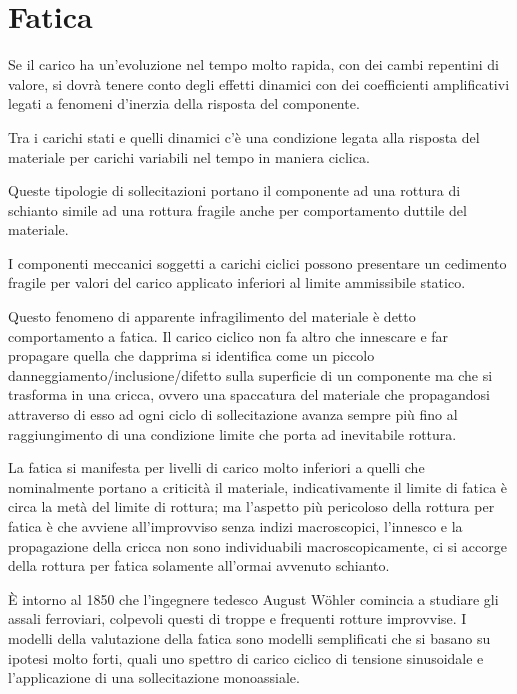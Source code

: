 
	
\section{Fatica}
Se il carico ha un'evoluzione nel tempo molto rapida, con dei cambi repentini di valore, si dovrà tenere conto degli effetti dinamici con dei coefficienti amplificativi legati a fenomeni d'inerzia della risposta del componente. \newline
		
		Tra i carichi stati e quelli dinamici c'è una condizione legata alla risposta del materiale per carichi variabili nel tempo in maniera ciclica.
		
		Queste tipologie di sollecitazioni portano il componente ad una rottura di schianto simile ad una rottura fragile anche per comportamento duttile del materiale. \newline
		
		I componenti meccanici soggetti a carichi ciclici possono presentare un cedimento fragile per valori del carico applicato inferiori al limite ammissibile statico.
		
		Questo fenomeno di apparente infragilimento del materiale è detto comportamento a fatica. Il carico ciclico non fa altro che innescare e far propagare quella che dapprima si identifica come un piccolo danneggiamento/inclusione/difetto sulla superficie di un componente ma che si trasforma in una cricca, ovvero una spaccatura del materiale che propagandosi attraverso di esso ad ogni ciclo di sollecitazione avanza sempre più fino al raggiungimento di una condizione limite che porta ad inevitabile rottura. \newline
		
		La fatica si manifesta per livelli di carico molto inferiori a quelli che nominalmente portano a criticità il materiale, indicativamente il limite di fatica è circa la metà del limite di rottura; ma l'aspetto più pericoloso della rottura per fatica è che avviene all'improvviso senza indizi macroscopici, l'innesco e la propagazione della cricca non sono individuabili macroscopicamente, ci si accorge della rottura per fatica solamente all'ormai avvenuto schianto. \newline
		
		È intorno al 1850 che l'ingegnere tedesco August Wöhler comincia a studiare gli assali ferroviari, colpevoli questi di troppe e frequenti rotture improvvise. I modelli della valutazione della fatica sono modelli semplificati che si basano su ipotesi molto forti, quali uno spettro di carico ciclico di tensione sinusoidale e l'applicazione di una sollecitazione monoassiale. 
		

